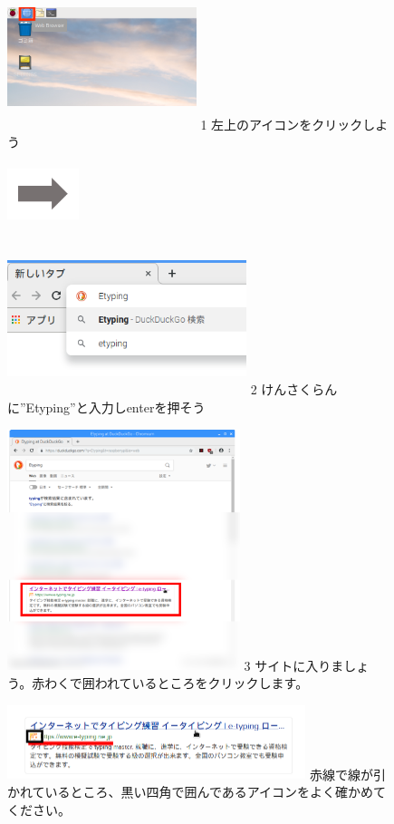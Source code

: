 \documentclass[a4paper,12pt]{jarticle}
\begin{document}
\begin{figure}[t]
\centering

\begin{minipage}{5.695cm}
\includegraphics[width=5.523cm,height=4.249cm]{textbook-img071.png}
1 左上のアイコンをクリックしよう
\end{minipage}
\includegraphics[width=2.094cm,height=1.771cm]{textbook-img084.png}
\begin{minipage}{6.582cm}
\includegraphics[width=6.985cm,height=4.479cm]{textbook-img083.png}
2 けんさくらんに”Etyping”と入力しenterを押そう
\end{minipage}


\begin{minipage}{6.582cm}
\includegraphics[width=6.796cm,height=7.029cm]{textbook-img086.png}
3 サイトに入りましょう。赤わくで囲われているところをクリックします。
\end{minipage}
\begin{minipage}{8.482cm}
\includegraphics[width=8.714cm,height=2.163cm]{textbook-img085.png}
赤線で線が引かれているところ、黒い四角で囲んであるアイコンをよく確かめてください。
\end{minipage}







\end{figure}
\end{document}
